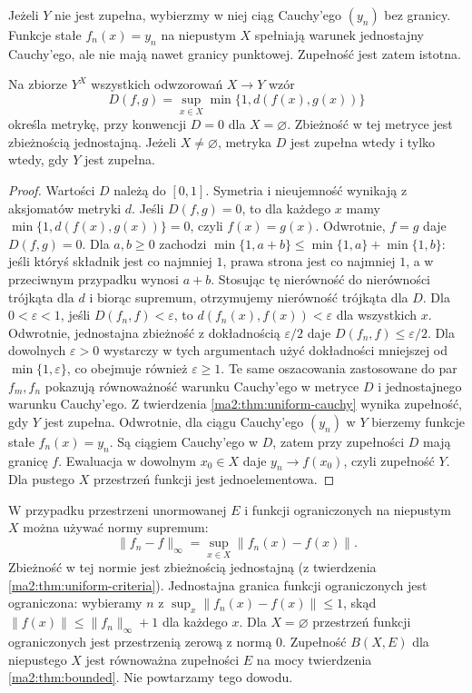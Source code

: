 Jeżeli $Y$ nie jest zupełna, wybierzmy w niej ciąg
Cauchy'ego $(y_n)$ bez granicy. Funkcje stałe
$f_n(x)=y_n$ na niepustym $X$ spełniają warunek
jednostajny Cauchy'ego, ale nie mają nawet granicy
punktowej. Zupełność jest zatem istotna.

\begin{twierdzenie}
\label{ma2:thm:uniform-metric}
Na zbiorze $Y^X$ wszystkich odwzorowań $X\to Y$
wzór
\[
 D(f,g)=\sup_{x\in X}\min\{1,d(f(x),g(x))\}
\]
określa metrykę, przy konwencji $D=0$ dla $X=\varnothing$.
Zbieżność w tej metryce jest zbieżnością jednostajną.
Jeżeli $X\ne\varnothing$, metryka $D$ jest zupełna
wtedy i tylko wtedy, gdy $Y$ jest zupełna.
\end{twierdzenie}
\begin{proof}
Wartości $D$ należą do $[0,1]$. Symetria
i nieujemność wynikają z aksjomatów metryki $d$.
Jeśli $D(f,g)=0$, to dla każdego $x$ mamy
$\min\{1,d(f(x),g(x))\}=0$, czyli $f(x)=g(x)$.
Odwrotnie, $f=g$ daje $D(f,g)=0$.
Dla $a,b\ge0$ zachodzi
$\min\{1,a+b\}\le\min\{1,a\}+\min\{1,b\}$:
jeśli któryś składnik jest co najmniej $1$, prawa
strona jest co najmniej $1$, a w przeciwnym przypadku
wynosi $a+b$. Stosując tę nierówność do nierówności
trójkąta dla $d$ i biorąc supremum, otrzymujemy
nierówność trójkąta dla $D$.
Dla $0<\varepsilon<1$, jeśli $D(f_n,f)<\varepsilon$,
to $d(f_n(x),f(x))<\varepsilon$ dla wszystkich $x$.
Odwrotnie, jednostajna zbieżność z dokładnością
$\varepsilon/2$ daje $D(f_n,f)\le\varepsilon/2$.
Dla dowolnych $\varepsilon>0$ wystarczy w tych
argumentach użyć dokładności mniejszej od
$\min\{1,\varepsilon\}$, co obejmuje również
$\varepsilon\ge1$.
Te same oszacowania zastosowane do par $f_m,f_n$
pokazują równoważność warunku Cauchy'ego w metryce
$D$ i jednostajnego warunku Cauchy'ego.
Z twierdzenia \ref{ma2:thm:uniform-cauchy}
wynika zupełność, gdy $Y$ jest zupełna.
Odwrotnie, dla ciągu Cauchy'ego $(y_n)$ w $Y$
bierzemy funkcje stałe $f_n(x)=y_n$. Są ciągiem
Cauchy'ego w $D$, zatem przy zupełności $D$ mają
granicę $f$. Ewaluacja w dowolnym $x_0\in X$
daje $y_n\to f(x_0)$, czyli zupełność $Y$.
Dla pustego $X$ przestrzeń funkcji jest jednoelementowa.
\end{proof}

W przypadku przestrzeni unormowanej $E$ i funkcji
ograniczonych na niepustym $X$ można używać normy supremum:
\[
 \|f_n-f\|_\infty=\sup_{x\in X}\|f_n(x)-f(x)\|.
\]
Zbieżność w tej normie jest zbieżnością jednostajną
(z twierdzenia \ref{ma2:thm:uniform-criteria}).
Jednostajna granica funkcji ograniczonych jest
ograniczona: wybieramy $n$ z
$\sup_x\|f_n(x)-f(x)\|\le1$, skąd
$\|f(x)\|\le\|f_n\|_\infty+1$ dla każdego $x$.
Dla $X=\varnothing$ przestrzeń funkcji ograniczonych
jest przestrzenią zerową z normą $0$.
Zupełność $B(X,E)$ dla niepustego $X$ jest równoważna
zupełności $E$ na mocy twierdzenia \ref{ma2:thm:bounded}.
Nie powtarzamy tego dowodu.

